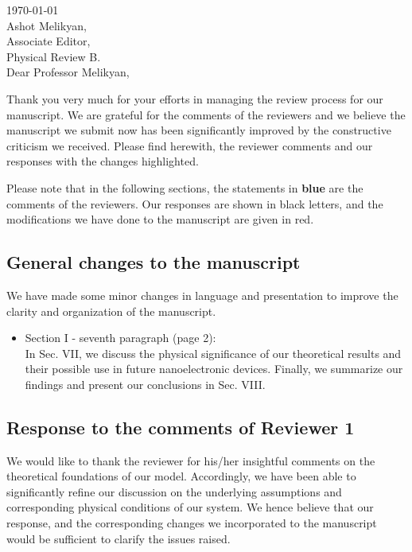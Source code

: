 \documentclass{article}
\begin{document}

\today\\

Ashot Melikyan,\\
Associate Editor,\\
Physical Review B.\\

Dear Professor Melikyan,

Thank you very much for your efforts in managing the review process for our manuscript. We are grateful for the comments of the reviewers and we believe the manuscript we submit now has been significantly improved by the constructive criticism we received. Please find herewith, the reviewer comments and our responses with the changes highlighted.

Please note that in the following sections, the statements in {\color{RoyalBlue} \textbf{blue}} are the comments of the reviewers. Our responses are shown in black letters, and the modifications we have done to the manuscript are given in {\color{Red} red}.

\subsection*{General changes to the manuscript}


We have made some minor changes in language and presentation to improve the clarity and organization of the manuscript.
\begin{itemize}
    \item Section I - seventh paragraph (page 2): \\
        {\color{Red} In Sec. VII, we discuss the physical significance of our theoretical results and their possible use in future nanoelectronic devices.
        Finally, we summarize our findings and present our conclusions in Sec. VIII.}
\end{itemize}

\subsection*{Response to the comments of Reviewer 1}

We would like to thank the reviewer for his/her insightful comments on the theoretical foundations of our model. Accordingly, we have been able to significantly refine our discussion on the underlying assumptions and corresponding physical conditions of our system. We hence believe that our response, and the corresponding changes we incorporated to the manuscript would be sufficient to clarify the issues raised.
\end{document}
